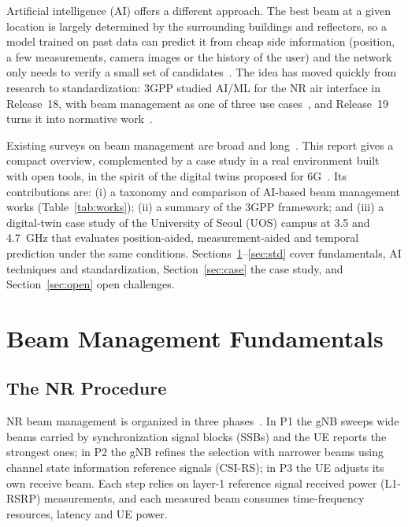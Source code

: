 \documentclass[journal]{IEEEtran}
\begin{document}
Artificial intelligence (AI) offers a different approach. The best beam at a given location is largely determined by the surrounding buildings and reflectors, so a model trained on past data can predict it from cheap side information (position, a few measurements, camera images or the history of the user) and the network only needs to verify a small set of candidates~\cite{ma2023dlbm,xue2024survey}. The idea has moved quickly from research to standardization: 3GPP studied AI/ML for the NR air interface in Release~18, with beam management as one of three use cases~\cite{3gpp38843}, and Release~19 turns it into normative work~\cite{3gppRel19}.

Existing surveys on beam management are broad and long~\cite{xue2024survey}. This report gives a compact overview, complemented by a case study in a real environment built with open tools, in the spirit of the digital twins proposed for 6G~\cite{alkhateeb2023twins}. Its contributions are: (i) a taxonomy and comparison of AI-based beam management works (Table~\ref{tab:works}); (ii) a summary of the 3GPP framework; and (iii) a digital-twin case study of the University of Seoul (UOS) campus at 3.5 and 4.7~GHz that evaluates position-aided, measurement-aided and temporal prediction under the same conditions. Sections~\ref{sec:fund}--\ref{sec:std} cover fundamentals, AI techniques and standardization, Section~\ref{sec:case} the case study, and Section~\ref{sec:open} open challenges.

\section{Beam Management Fundamentals}
\label{sec:fund}
\subsection{The NR Procedure}
NR beam management is organized in three phases~\cite{giordani2019tutorial}. In P1 the gNB sweeps wide beams carried by synchronization signal blocks (SSBs) and the UE reports the strongest ones; in P2 the gNB refines the selection with narrower beams using channel state information reference signals (CSI-RS); in P3 the UE adjusts its own receive beam. Each step relies on layer-1 reference signal received power (L1-RSRP) measurements, and each measured beam consumes time-frequency resources, latency and UE power.
\end{document}
